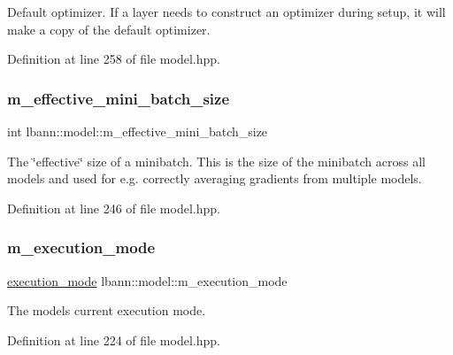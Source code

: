 Default optimizer. If a layer needs to construct an optimizer during setup, it will make a copy of the default optimizer. 

Definition at line 258 of file model.\+hpp.

\mbox{\label{classlbann_1_1model_a4887fd2816e7c51b24cb8bf8e4a80a1c}} 
\subsubsection{\texorpdfstring{m\+\_\+effective\+\_\+mini\+\_\+batch\+\_\+size}{m\_effective\_mini\_batch\_size}}
{\footnotesize\ttfamily int lbann\+::model\+::m\+\_\+effective\+\_\+mini\+\_\+batch\+\_\+size\hspace{0.3cm}{\ttfamily [protected]}}

The \char`\"{}effective\char`\"{} size of a minibatch. This is the size of the minibatch across all models and used for e.\+g. correctly averaging gradients from multiple models. 

Definition at line 246 of file model.\+hpp.

\mbox{\label{classlbann_1_1model_a2166e2aad256a335ace3bdcae5da2614}} 
\subsubsection{\texorpdfstring{m\+\_\+execution\+\_\+mode}{m\_execution\_mode}}
{\footnotesize\ttfamily \hyperlink{base_8hpp_a2781a159088df64ed7d47cc91c4dc0a8}{execution\+\_\+mode} lbann\+::model\+::m\+\_\+execution\+\_\+mode\hspace{0.3cm}{\ttfamily [protected]}}

The model\textquotesingle{}s current execution mode. 

Definition at line 224 of file model.\+hpp.

\mbox{\label{classlbann_1_1model_a0229fc226ec163d1411548446104569d}} 
